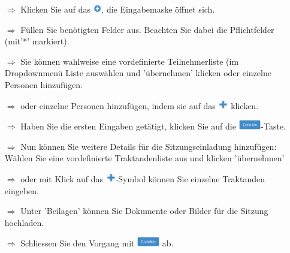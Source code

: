 \documentclass{article}
\begin{document}


\breakpage


\vspace{\baselineskip}



\begin{multicols}{2}

\begin{tcolorbox}[colback=blue!5,colframe=blue!40!black,title=Zu einer neuen Sitzung einladen]
\begin{itemize}
  \item[$\Longrightarrow$] Klicken Sie auf das \includegraphics[height=10pt]{Icons/Plussymbol.jpg}, die Eingabemaske öffnet sich.
  \item[$\Longrightarrow$] Füllen Sie benötigten Felder aus. Beachten Sie dabei die Pflichtfelder (mit'*' markiert).
  \item[$\Longrightarrow$] Sie können wahlweise eine vordefinierte Teilnehmerliste (im Dropdownmenü Liste auswählen und 'übernehmen' klicken oder einzelne Personen hinzufügen.
  \item[$\Longrightarrow$] oder einzelne Personen hinzufügen, indem sie auf das \includegraphics[height=12pt]{Icons/Pluszeichen.jpg} klicken.	
  \item[$\Longrightarrow$] Haben Sie die ersten Eingaben getätigt, klicken Sie auf die \includegraphics[height=12pt]{Icons/B_Erstellen.jpg}-Taste. 
	\item[$\Longrightarrow$] Nun können Sie weitere Details für die Sitzungseinladung hinzufügen: Wählen Sie eine vordefinierte Traktandenliste aus und klicken 'übernehmen'
  \item[$\Longrightarrow$] oder mit Klick auf das \includegraphics[height=12pt]{Icons/Pluszeichen.jpg}-Symbol können Sie einzelne Traktanden eingeben.
  \item[$\Longrightarrow$] Unter 'Beilagen' können Sie Dokumente oder Bilder für die Sitzung hochladen.						
	\item[$\Longrightarrow$] Schliessen Sie den Vorgang mit \includegraphics[height=12pt]{Icons/B_Erstellen.jpg} ab.
\end{itemize}
\end{tcolorbox}



\end{multicols}
\end{document}

